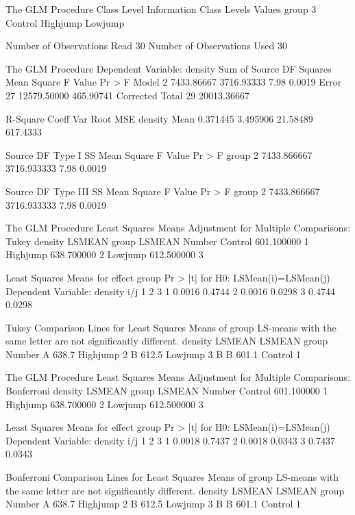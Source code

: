 \documentclass{article}
\begin{document}
\begin{Woutput}
The GLM Procedure
             Class Level Information
Class         Levels    Values
group              3    Control Highjump Lowjump

Number of Observations Read          30
Number of Observations Used          30

The GLM Procedure
Dependent Variable: density
                                        Sum of
Source                      DF         Squares     Mean Square    F Value    Pr > F
Model                        2      7433.86667      3716.93333       7.98    0.0019
Error                       27     12579.50000       465.90741
Corrected Total             29     20013.36667

R-Square     Coeff Var      Root MSE    density Mean
0.371445      3.495906      21.58489        617.4333

Source                      DF       Type I SS     Mean Square    F Value    Pr > F
group                        2     7433.866667     3716.933333       7.98    0.0019

Source                      DF     Type III SS     Mean Square    F Value    Pr > F
group                        2     7433.866667     3716.933333       7.98    0.0019

The GLM Procedure
Least Squares Means
Adjustment for Multiple Comparisons: Tukey
                 density      LSMEAN
group             LSMEAN      Number
Control       601.100000           1
Highjump      638.700000           2
Lowjump       612.500000           3

     Least Squares Means for effect group
     Pr > |t| for H0: LSMean(i)=LSMean(j)
         Dependent Variable: density
i/j              1             2             3
   1                      0.0016        0.4744
   2        0.0016                      0.0298
   3        0.4744        0.0298

Tukey Comparison Lines for Least Squares Means of group
LS-means with the same letter are not significantly different.
     density                LSMEAN
      LSMEAN    group       Number
A      638.7    Highjump         2
B      612.5    Lowjump          3
B
B      601.1    Control          1

The GLM Procedure
Least Squares Means
Adjustment for Multiple Comparisons: Bonferroni
                 density      LSMEAN
group             LSMEAN      Number
Control       601.100000           1
Highjump      638.700000           2
Lowjump       612.500000           3

     Least Squares Means for effect group
     Pr > |t| for H0: LSMean(i)=LSMean(j)
         Dependent Variable: density
i/j              1             2             3
   1                      0.0018        0.7437
   2        0.0018                      0.0343
   3        0.7437        0.0343

Bonferroni Comparison Lines for Least Squares Means of group
LS-means with the same letter are not significantly different.
     density                LSMEAN
      LSMEAN    group       Number
A      638.7    Highjump         2
B      612.5    Lowjump          3
B
B      601.1    Control          1
\end{Woutput}
\end{document}
